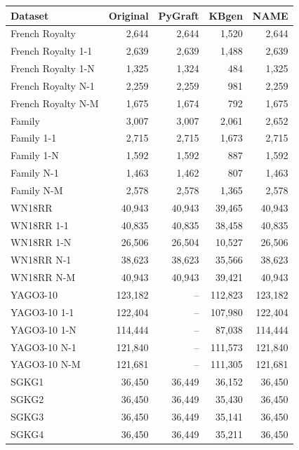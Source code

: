 \begin{tabular}{lrrrr}
\toprule
Dataset & Original & PyGraft & KBgen & NAME \\
\midrule
French Royalty & 2{,}644 & 2{,}644 & 1{,}520 & 2{,}644 \\
French Royalty 1-1 & 2{,}639 & 2{,}639 & 1{,}488 & 2{,}639 \\
French Royalty 1-N & 1{,}325 & 1{,}324 & 484 & 1{,}325 \\
French Royalty N-1 & 2{,}259 & 2{,}259 & 981 & 2{,}259 \\
French Royalty N-M & 1{,}675 & 1{,}674 & 792 & 1{,}675 \\
\midrule
Family & 3{,}007 & 3{,}007 & 2{,}061 & 2{,}652 \\
Family 1-1 & 2{,}715 & 2{,}715 & 1{,}673 & 2{,}715 \\
Family 1-N & 1{,}592 & 1{,}592 & 887 & 1{,}592 \\
Family N-1 & 1{,}463 & 1{,}462 & 807 & 1{,}463 \\
Family N-M & 2{,}578 & 2{,}578 & 1{,}365 & 2{,}578 \\
\midrule
WN18RR & 40{,}943 & 40{,}943 & 39{,}465 & 40{,}943 \\
WN18RR 1-1 & 40{,}835 & 40{,}835 & 38{,}458 & 40{,}835 \\
WN18RR 1-N & 26{,}506 & 26{,}504 & 10{,}527 & 26{,}506 \\
WN18RR N-1 & 38{,}623 & 38{,}623 & 35{,}566 & 38{,}623 \\
WN18RR N-M & 40{,}943 & 40{,}943 & 39{,}421 & 40{,}943 \\
\midrule
YAGO3-10 & 123{,}182 & – & 112{,}823 & 123{,}182 \\
YAGO3-10 1-1 & 122{,}404 & – & 107{,}980 & 122{,}404 \\
YAGO3-10 1-N & 114{,}444 & – & 87{,}038 & 114{,}444 \\
YAGO3-10 N-1 & 121{,}840 & – & 111{,}573 & 121{,}840 \\
YAGO3-10 N-M & 121{,}681 & – & 111{,}305 & 121{,}681 \\
\midrule
SGKG1 & 36{,}450 & 36{,}449 & 36{,}152 & 36{,}450 \\
SGKG2 & 36{,}450 & 36{,}449 & 35{,}430 & 36{,}450 \\
SGKG3 & 36{,}450 & 36{,}449 & 35{,}141 & 36{,}450 \\
SGKG4 & 36{,}450 & 36{,}449 & 35{,}211 & 36{,}450 \\
\bottomrule
\end{tabular}
